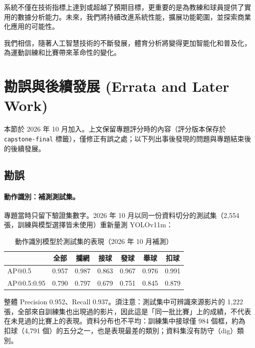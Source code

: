 \documentclass[a4paper,14pt,oneside]{article}
\begin{document}
系統不僅在技術指標上達到或超越了預期目標，更重要的是為教練和球員提供了實用的數據分析能力。未來，我們將持續改進系統性能，擴展功能範圍，並探索商業化應用的可能性。

我們相信，隨著人工智慧技術的不斷發展，體育分析將變得更加智能化和普及化，為運動訓練和比賽帶來革命性的變化。

\newpage
\section{勘誤與後續發展 (Errata and Later Work)}\label{sec:errata}

本節於 2026 年 10 月加入。上文保留專題評分時的內容（評分版本保存於 \texttt{capstone-final} 標籤），僅修正有誤之處；以下列出事後發現的問題與專題結束後的後續發展。

\subsection{勘誤}

\paragraph{動作識別：補測測試集。}專題當時只留下驗證集數字。2026 年 10 月以同一份資料切分的測試集（2,554 張，訓練與模型選擇皆未使用）重新量測 YOLOv11m：

\begin{table}[H]
    \centering
    \caption{動作識別模型於測試集的表現（2026 年 10 月補測）}
    \begin{tabular}{|l|c|c|c|c|c|c|}
        \hline
        & \textbf{全部} & \textbf{攔網} & \textbf{接球} & \textbf{發球} & \textbf{舉球} & \textbf{扣球} \\
        \hline
        AP@0.5 & 0.957 & 0.987 & 0.863 & 0.967 & 0.976 & 0.991 \\
        \hline
        AP@0.5:0.95 & 0.790 & 0.797 & 0.679 & 0.751 & 0.845 & 0.879 \\
        \hline
    \end{tabular}
\end{table}

整體 Precision 0.952、Recall 0.937。須注意：測試集中可辨識來源影片的 1,222 張，全部來自訓練集也出現過的影片，因此這是「同一批比賽」上的成績，不代表在未見過的比賽上的表現。資料分布也不平均：訓練集中接球僅 984 個框，約為扣球（4,791 個）的五分之一，也是表現最差的類別；資料集沒有防守（dig）類別。
\end{document}
